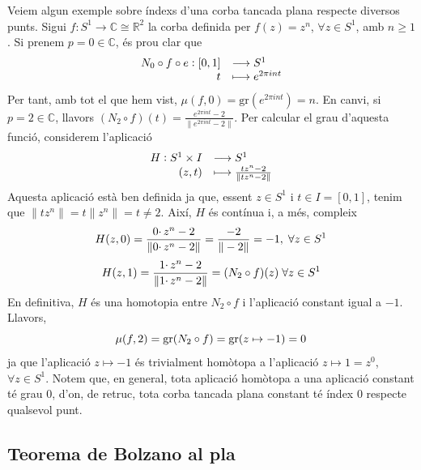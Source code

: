 \documentclass[../main.tex]{subfiles}
\begin{document}
\begin{ej}
\label{ej:indexdunacorbatancada} Veiem algun exemple sobre índexs d'una corba tancada plana respecte diversos punts. Sigui $f:S^1\rightarrow \mathbb{C}\cong \mathbb{R}^2$ la corba definida per $f(z) = z^n$, $\forall z\in S^1$, amb $n\geq 1$. Si prenem $p = 0\in\mathbb{C}$, és prou clar que
\begin{equation}
    \notag
    \begin{array}{rl}
        N_0\circ f\circ e:[0,1] & \longrightarrow S^1 \\
        t & \longmapsto e^{2\pi int}
    \end{array}
\end{equation}
Per tant, amb tot el que hem vist, $\mu(f,0) = \mathrm{gr}(e^{2\pi int})=n$. En canvi, si $p=2\in\mathbb{C}$, llavors $(N_2\circ f)(t) = \frac{e^{2\pi int}-2}{\|e^{2\pi int}-2\|}$. Per calcular el grau d'aquesta funció, considerem l'aplicació
\begin{equation}
    \notag
    \begin{array}{rl}
        H:S^1\times I & \longrightarrow S^1 \\
        (z,t) & \longmapsto \frac{tz^n-2}{\|tz^n-2\|}
    \end{array}
\end{equation}
Aquesta aplicació està ben definida ja que, essent $z\in S^1$ i $t\in I=[0,1]$, tenim que $\|tz^n\|=t\|z^n\|=t\not=2$. Així, $H$ és contínua i, a més, compleix
\begin{equation}
    \notag
    H(z,0)= \frac{0\cdotp z^n-2}{\|0\cdotp z^n-2\|} = \frac{-2}{\|-2\|} = -1,\;\forall z\in S^1
\end{equation}
\begin{equation}
    \notag
    H(z,1) = \frac{1\cdotp z^n-2}{\|1\cdotp z^n-2\|} = (N_2\circ f)(z)\;\forall z\in S^1
\end{equation}
En definitiva, $H$ és una homotopia entre $N_2\circ f$ i l'aplicació constant igual a $-1$. Llavors,
\begin{equation}
    \notag
    \mu(f,2) = \mathrm{gr}(N_2\circ f) = \mathrm{gr}(z\mapsto -1) = 0
\end{equation}
ja que l'aplicació $z\mapsto -1$ és trivialment homòtopa a l'aplicació $z\mapsto 1 = z^0$, $\forall z\in S^1$. Notem que, en general, tota aplicació homòtopa a una aplicació constant té grau 0, d'on, de retruc, tota corba tancada plana constant té índex 0 respecte qualsevol punt.
\end{ej}

\subsection{Teorema de Bolzano al pla}
\end{document}
